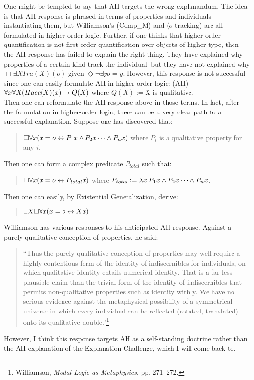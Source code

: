 One might be tempted to say that AH targets the wrong explanandum. The idea is that AH response is phrased in terms of properties and individuals instantiating them, but Williamson's (Comp_M) and ($o$-tracking) are all formulated in higher-order logic. Further, if one thinks that higher-order quantification is not first-order quantification over objects of higher-type, then the AH response has failed to explain the right thing. They have explained why properties of a certain kind track the individual, but they have not explained why $\Box \exists X Tra(X)(o)$ given $\Diamond \neg \exists y o=y$. 
However, this response is not successful since one can easily formulate AH in higher-order logic: 
(AH) $\forall x \forall X (Haec(X)(x) \rightarrow Q(X)$ where $Q(X) := $X is qualitative$ $. \\
Then one can reformulate the AH response above in those terms. 
In fact, after the formulation in higher-order logic, there can be a very clear path to a successful explanation. Suppose one has discovered that: \begin{quote}
$\Box \forall x (x=o \leftrightarrow P_1x \wedge P_2x \cdots \wedge P_nx)$ where $P_i$ is a qualitative property for any $i$. \end{quote}
Then one can form a complex predicate $P_{total}$ such that: 
\begin{quote}
$\Box \forall x(x=o \leftrightarrow P_{total}x)$ where $P_{total} := \lambda x. P_1x \wedge P_2x \cdots \wedge P_nx$. \end{quote}
Then one can easily, by Existential Generalization, derive:
\begin{quote}
$\exists X \Box \forall x(x=o \leftrightarrow Xx)$ \end{quote}

Williamson has various responses to his anticipated AH response. Against a purely qualitative conception of properties, he said: 
\begin{quote}
``Thus the purely qualitative conception of properties may well require a highly contentious form of the identity of indiscernibles for individuals, on which qualitative identity entails numerical identity. That is a far less plausible claim than the trivial form of the identity of indiscernibles that permits non-qualitative properties such as identity with y. We have no serious evidence against the metaphysical possibility of a symmetrical universe in which every individual can be reflected (rotated, translated) onto its qualitative double."\footnote{Williamson, \textit{Modal Logic as Metaphysics}, pp. 271--272.}
\end{quote}
However, I think this response targets AH as a self-standing doctrine rather than the AH explanation of the Explanation Challenge, which I will come back to. 

